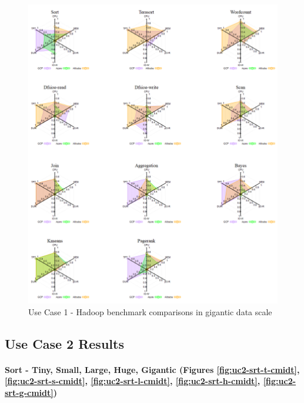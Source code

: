 \documentclass[review]{elsarticle}
\begin{document}
\begin{figure}[p]
	\caption{Use Case 1 - Hadoop benchmark comparisons in gigantic data scale}
	\label{fig:uc1-gigantic}
	\includegraphics[width=\textwidth]{uc1-gigantic}
	\centering
\end{figure}


\subsection{Use Case 2 Results}

\paragraph{Sort - Tiny, Small, Large, Huge, Gigantic (Figures \ref{fig:uc2-srt-t-cmidt}, \ref{fig:uc2-srt-s-cmidt}, \ref{fig:uc2-srt-l-cmidt}, \ref{fig:uc2-srt-h-cmidt}, \ref{fig:uc2-srt-g-cmidt})}
\end{document}
